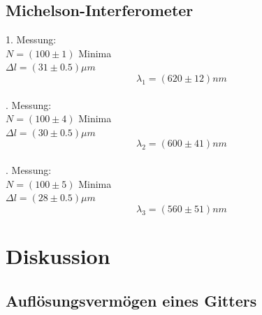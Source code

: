 \documentclass[12pt,a4paper]{article}
\begin{document}
\begin{multicols}{2}

\subsection{Michelson-Interferometer}

1. Messung:\\
$N = (100 \pm 1)$ Minima\\
$\Delta l = (31\pm 0.5)\mu m$\\
$$\lambda_1=(620\pm 12)nm$$\\

. Messung:\\
$N=(100 \pm 4)$ Minima\\
$\Delta l = (30 \pm 0.5) \mu m$\\
$$\lambda_2 =(600\pm 41)nm$$\\

. Messung:\\
$N =(100 \pm 5)$ Minima\\
$\Delta l = (28 \pm 0.5)\mu m$\\
$$\lambda_3 = (560\pm 51) nm$$


\section{Diskussion}
\subsection{Auflösungsvermögen eines Gitters}


\end{multicols}
\end{document}
